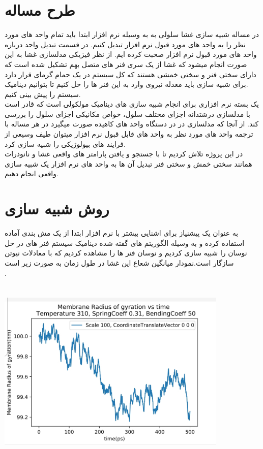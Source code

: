 \documentclass[12pt,onecolumn,a4paper]{report}
\begin{document}
\section{\LARGE{طرح مساله}}
در مساله شبیه سازی غشا سلولی به به وسیله نرم افزار ابتدا باید تمام واحد های مورد نظر را به واحد های مورد قبول نرم افزار تبدیل کنیم. در قسمت تبدیل واحد درباره واحد های مورد قبول نرم افزار صحبت کرده ایم. از نظر فیزیکی مدلسازی غشا به این صورت انجام میشود که غشا از یک سری فنر های متصل  بهم تشکیل شده است که دارای سختی فنر و سختی خمشی هستند که کل سیستم در یک حمام گرمای قرار دارد .برای شبیه سازی باید معدله نیروی وارد به این فنر ها را حل کنیم تا بتوانیم دینامیک سیستم را پیش بینی کنیم.\\

 یک بسته نرم افزاری برای انجام شبیه سازی های دینامیک مولکولی است که قادر است
با مدلسازی درشتدانه اجزای مختلف سلول، خواص مکانیکی اجزای سلول را بررسی کند.
از آنجا که مدلسازی در  در دستگاه واحد های کاهیده صورت میگیرد در هر مساله با ترجمه واحد های مورد نظر به واحد های قابل قبول نرم افزار میتوان طیف وسیعی از فرایند های بیولوژیکی را شبیه سازی کرد.\\
در این پروژه تلاش کردیم تا با جستجو و یافتن پارامتر های واقعی غشا و نانوذرات همانند سختی خمش و سختی فنر  تبدیل آن ها به واحد های نرم افزار یک شبیه سازی واقعی انجام دهیم.




\section{\LARGE{روش شبیه سازی}}
به عنوان یک پیشنیاز برای اشنایی بیشتر با نرم افزار ابتدا از یک مش بندی آماده استفاده کرده و به  وسیله الگوریتم های گفته شده دینامیک سیستم فنر های در حل نوسان را شبیه سازی کردیم و نوسان فنر ها را مشاهده کردیم که با معادلات نیوتن سازگار است.نمودار میانگین شعاع این غشا در طول زمان به صورت زیر است\\.
\begin{center}
\includegraphics[width=11cm, height=9cm]{20210215_142631.jpg}
\end{center}\\
\end{document}
